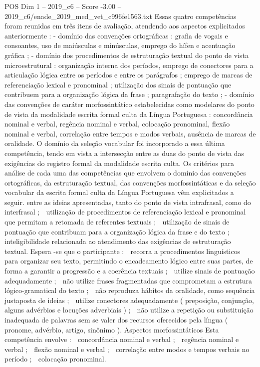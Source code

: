 \begin{textsample}{POS Dim 1 – 2019\_c6 – Score -3.00 – 2019\_c6/enade\_2019\_med\_vet\_c996fe1563.txt}
Essas quatro competências foram reunidas em três itens de avaliação, atendendo aos aspectos explicitados anteriormente : - domínio das convenções ortográficas : grafia de vogais e consoantes, uso de maiúsculas e minúsculas, emprego do hífen e acentuação gráfica ; - domínio dos procedimentos de estruturação textual do ponto de vista microestrutural : organização interna dos períodos, emprego de conectores para a articulação lógica entre os períodos e entre os parágrafos ; emprego de marcas de referenciação lexical e pronominal ; utilização dos sinais de pontuação que contribuem para a organização lógica da frase ; paragrafação do texto ; - domínio das convenções de caráter morfossintático estabelecidas como modelares do ponto de vista da modalidade escrita formal culta da Língua Portuguesa : concordância nominal e verbal, regência nominal e verbal, colocação pronominal, flexão nominal e verbal, correlação entre tempos e modos verbais, ausência de marcas de oralidade.
O domínio da seleção vocabular foi incorporado a essa última competência, tendo em vista a intersecção entre as duas do ponto de vista das exigências do registro formal da modalidade escrita culta.
Os critérios para análise de cada uma das competências que envolvem o domínio das convenções ortográficas, da estruturação textual, das convenções morfossintáticas e da seleção vocabular da escrita formal culta da Língua Portuguesa vêm explicitados a seguir. entre as ideias apresentadas, tanto do ponto de vista intrafrasal, como do interfrasal ;  utilização de procedimentos de referenciação lexical e pronominal que permitam a retomada de referentes textuais ;  utilização de sinais de pontuação que contribuam para a organização lógica da frase e do texto ;  inteligibilidade relacionada ao atendimento das exigências de estruturação textual.
Espera -se que o participante :  recorra a procedimentos linguísticos para organizar seu texto, permitindo o encadeamento lógico entre suas partes, de forma a garantir a progressão e a coerência textuais ;  utilize sinais de pontuação adequadamente ;  não utilize frases fragmentadas que comprometam a estrutura lógico-gramatical do texto ;  não reproduza hábitos da oralidade, como sequência justaposta de ideias ;  utilize conectores adequadamente ( preposição, conjunção, alguns advérbios e locuções adverbiais ) ;  não utilize a repetição ou substituição inadequada de palavras sem se valer dos recursos oferecidos pela língua ( pronome, advérbio, artigo, sinônimo ).
Aspectos morfossintáticos Esta competência envolve :  concordância nominal e verbal ;  regência nominal e verbal ;  flexão nominal e verbal ;  correlação entre modos e tempos verbais no período ;  colocação pronominal.

\end{textsample}
